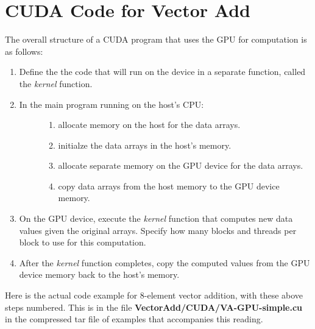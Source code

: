 \documentclass[letterpaper,10pt,openany,oneside]{sphinxmanual}
\begin{document}
\section{CUDA Code for Vector Add}
\label{Decomposition/CUDA_VecAdd:cuda-code-for-vector-add}
The overall structure of a CUDA program that uses the GPU for computation is as follows:
\begin{enumerate}
\item {} 
Define the the code that will run on the device in a separate function, called the \emph{kernel} function.

\item {} \begin{description}
\item[{In the main program running on the host's CPU:}] \leavevmode\begin{enumerate}
\item {} 
allocate memory on the host for the data arrays.

\item {} 
initialze the data arrays in the host's memory.

\item {} 
allocate separate memory on the GPU device for the data arrays.

\item {} 
copy data arrays from the host memory to the GPU device memory.

\end{enumerate}

\end{description}

\item {} 
On the GPU device, execute the \emph{kernel} function that computes new data values given the original arrays. Specify how many blocks and threads per block to use for this computation.

\item {} 
After the \emph{kernel} function completes, copy the computed values from the GPU device memory back to the host's memory.

\end{enumerate}

Here is the actual code example for 8-element vector addition, with these above steps numbered. This is in the file
\textbf{VectorAdd/CUDA/VA-GPU-simple.cu} in the compressed tar file of examples that accompanies this reading.
\end{document}
